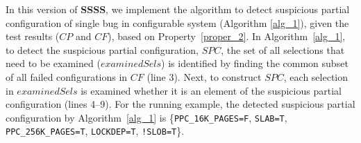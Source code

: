 

In this version of \textbf{SSSS}, we implement the algorithm to detect
suspicious partial configuration of single bug in configurable system
(Algorithm \ref{alg_1}), given the test results ($CP$ and $CF$), based
on Property~\ref{proper_2}. In Algorithm~\ref{alg_1}, to detect the
suspicious partial configuration, $SPC$, the set of all
selections that need to be examined ($examinedSels$) is identified by
finding the common subset of all failed configurations in $CF$ (line
3). Next, to construct $SPC$, each selection in
$examinedSels$ is examined whether it is an element of the
suspicious partial configuration (lines 4--9).
%
For the running example, the detected suspicious partial configuration
by Algorithm~\ref{alg_1} is \{\texttt{PPC\_16K\_PAGES=F},
\texttt{SLAB=T}, \texttt{PPC\_256K\_PAGES=T}, \texttt{LOCKDEP=T},
\texttt{!SLOB=T}\}.